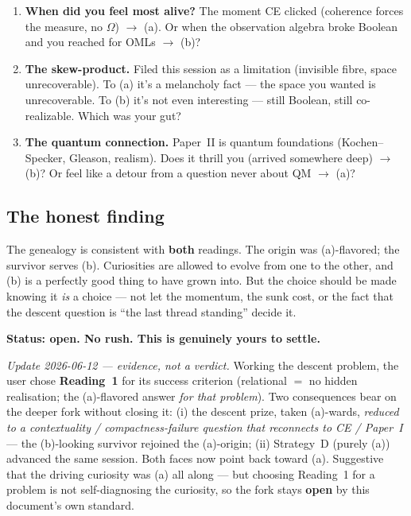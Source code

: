 \documentclass[11pt]{article}
\begin{document}
\begin{enumerate}[leftmargin=2em]
\item \textbf{When did you feel most alive?} The moment CE clicked (coherence
forces the measure, no $\Omega$) $\to$ (a). Or when the observation algebra broke
Boolean and you reached for OMLs $\to$ (b)?
\item \textbf{The skew-product.} Filed this session as a limitation (invisible
fibre, space unrecoverable). To (a) it's a melancholy fact --- the space you
wanted is unrecoverable. To (b) it's not even interesting --- still Boolean,
still co-realizable. Which was your gut?
\item \textbf{The quantum connection.} Paper~II is quantum foundations
(Kochen--Specker, Gleason, realism). Does it thrill you (arrived somewhere deep)
$\to$ (b)? Or feel like a detour from a question never about QM $\to$ (a)?
\end{enumerate}

\subsection{The honest finding}

The genealogy is consistent with \textbf{both} readings. The origin was
(a)-flavored; the survivor serves (b). Curiosities are allowed to evolve from one
to the other, and (b) is a perfectly good thing to have grown into. But the
choice should be made knowing it \emph{is} a choice --- not let the momentum, the
sunk cost, or the fact that the descent question is ``the last thread standing''
decide it.

\bigskip
\noindent
\textbf{Status: open. No rush. This is genuinely yours to settle.}

\bigskip
\noindent
\emph{Update 2026-06-12 --- evidence, not a verdict.} Working the descent problem,
the user chose \textbf{Reading~1} for its success criterion (relational $=$ no
hidden realisation; the (a)-flavored answer \emph{for that problem}). Two
consequences bear on the deeper fork without closing it: (i) the descent prize,
taken (a)-wards, \emph{reduced to a contextuality / compactness-failure question
that reconnects to CE / Paper~I} --- the (b)-looking survivor rejoined the
(a)-origin; (ii) Strategy~D (purely (a)) advanced the same session. Both faces now
point back toward (a). Suggestive that the driving curiosity was (a) all along ---
but choosing Reading~1 for a problem is not self-diagnosing the curiosity, so the
fork stays \textbf{open} by this document's own standard.
\end{document}

